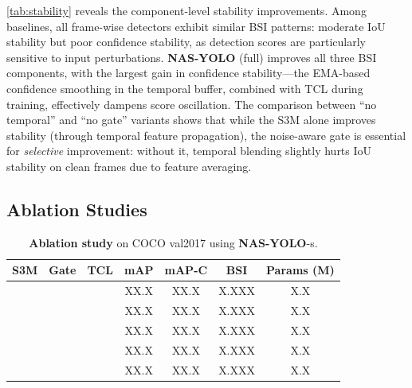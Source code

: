 \documentclass[review]{eccv2026}
\newcommand{\ours}{\textbf{NAS-YOLO}}
\newcommand{\cmark}{\ding{51}}
\newcommand{\xmark}{\ding{55}}
\newcommand{\ablBaseMap}{XX.X}
\newcommand{\ablBaseMapC}{XX.X}
\newcommand{\ablBaseBsi}{X.XXX}
\newcommand{\ablBaseParams}{X.X}
\newcommand{\ablSSMMap}{XX.X}
\newcommand{\ablSSMMapC}{XX.X}
\newcommand{\ablSSMBsi}{X.XXX}
\newcommand{\ablSSMParams}{X.X}
\newcommand{\ablSSMGateMap}{XX.X}
\newcommand{\ablSSMGateMapC}{XX.X}
\newcommand{\ablSSMGateBsi}{X.XXX}
\newcommand{\ablSSMGateParams}{X.X}
\newcommand{\ablSSMTCLMap}{XX.X}
\newcommand{\ablSSMTCLMapC}{XX.X}
\newcommand{\ablSSMTCLBsi}{X.XXX}
\newcommand{\ablSSMTCLParams}{X.X}
\newcommand{\ablFullMap}{XX.X}
\newcommand{\ablFullMapC}{XX.X}
\newcommand{\ablFullBsi}{X.XXX}
\newcommand{\ablFullParams}{X.X}
\begin{document}
\cref{tab:stability} reveals the component-level stability improvements.
Among baselines, all frame-wise detectors exhibit similar BSI patterns: moderate IoU stability but poor confidence stability, as detection scores are particularly sensitive to input perturbations.
\ours{} (full) improves all three BSI components, with the largest gain in confidence stability---the EMA-based confidence smoothing in the temporal buffer, combined with TCL during training, effectively dampens score oscillation.
The comparison between ``no temporal'' and ``no gate'' variants shows that while the S3M alone improves stability (through temporal feature propagation), the noise-aware gate is essential for \textit{selective} improvement: without it, temporal blending slightly hurts IoU stability on clean frames due to feature averaging.


\subsection{Ablation Studies}
\label{sec:ablation}

\begin{table}[t]
  \centering
  \caption{\textbf{Ablation study} on COCO val2017 using \ours{}-s.}
  \label{tab:ablation}
  \vspace{4pt}
  \small
  \setlength{\tabcolsep}{4pt}
  \begin{tabular}{ccc|ccc|c}
    \toprule
    \textbf{S3M} & \textbf{Gate} & \textbf{TCL} & \textbf{mAP} & \textbf{mAP-C} & \textbf{BSI} & \textbf{Params (M)} \\
    \midrule
    \xmark & \xmark & \xmark & \ablBaseMap & \ablBaseMapC & \ablBaseBsi & \ablBaseParams \\
    \cmark & \xmark & \xmark & \ablSSMMap & \ablSSMMapC & \ablSSMBsi & \ablSSMParams \\
    \cmark & \cmark & \xmark & \ablSSMGateMap & \ablSSMGateMapC & \ablSSMGateBsi & \ablSSMGateParams \\
    \cmark & \xmark & \cmark & \ablSSMTCLMap & \ablSSMTCLMapC & \ablSSMTCLBsi & \ablSSMTCLParams \\
    \rowcolor{bestcolor} \cmark & \cmark & \cmark & \ablFullMap & \ablFullMapC & \ablFullBsi & \ablFullParams \\
    \bottomrule
  \end{tabular}
\end{table}
\end{document}
